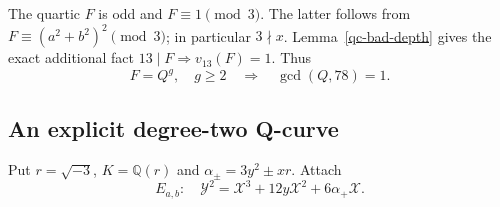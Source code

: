 The quartic $F$ is odd and $F\equiv1\pmod3$. The latter follows from
$F\equiv(a^2+b^2)^2\pmod3$; in particular $3\nmid x$.
Lemma~\ref{qc-bad-depth} gives the exact additional fact
$13\mid F\Rightarrow v_{13}(F)=1$. Thus
\begin{equation}\label{fm-pure-support}
 F=Q^g,\quad g\ge2\quad\Longrightarrow\quad\gcd(Q,78)=1.
\end{equation}

\subsection{An explicit degree-two Q-curve}

Put $r=\sqrt{-3}$, $K=\mathbb Q(r)$ and
$\alpha_\pm=3y^2\pm xr$. Attach
\begin{equation}\label{fm-frey-curve}
 E_{a,b}:\quad \mathcal Y^2=\mathcal X^3+
                 12y\mathcal X^2+6\alpha_+\mathcal X.
\end{equation}

